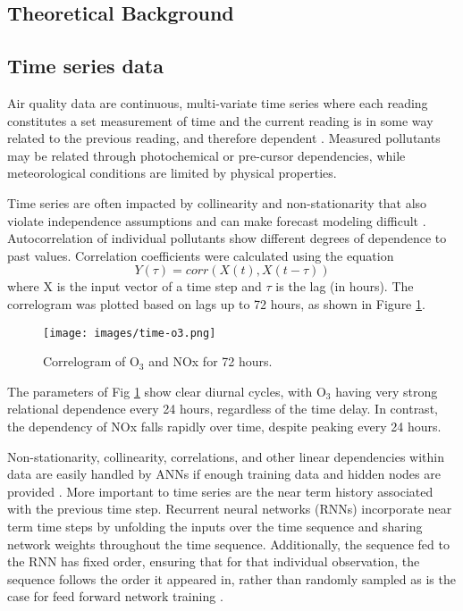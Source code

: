 \documentclass[preprint,12pt,a4paper,authoryear]{elsarticle}
\begin{document}
\begin{linenumbers}
\section{Theoretical Background}

\subsection{Time series data}
Air quality data are continuous, multi-variate time series where each reading constitutes a set measurement of time and the current reading is in some way related to the previous reading, and therefore dependent \citep{Gheyas2011}. Measured pollutants may be related through photochemical or pre-cursor dependencies, while meteorological conditions are limited by physical properties. 

Time series are often impacted by collinearity and non-stationarity that also violate independence assumptions and can make forecast modeling difficult \citep{Gheyas2011}. Autocorrelation of individual pollutants show different degrees of dependence to past values.  Correlation coefficients were calculated using the equation
%
\begin{equation}
\label{eq:corr}
Y(\tau)= corr(X(t),X(t - \tau))
\end{equation}
%
\noindent
where X is the input vector of a time step and $\tau$ is the lag (in hours). The correlogram was plotted based on lags up to 72 hours, as shown in Figure \ref{fig:serialcorr}.
%
\begin{figure}[H]
\centering
\texttt{[image: images/time-o3.png]}  %
\caption{Correlogram of O$_{3}$ and NOx for 72 hours.}
\label{fig:serialcorr}
\end{figure}
%
The parameters of Fig \ref{fig:serialcorr} show clear diurnal cycles, with O$_{3}$ having very strong relational dependence every 24 hours, regardless of the time delay. In contrast, the dependency of NOx falls rapidly over time, despite peaking every 24 hours. 

Non-stationarity, collinearity, correlations, and other linear dependencies within data are easily handled by ANNs if enough training data and hidden nodes are provided \citep{Goodfellow2016}. More important to time series are the near term history associated with the previous time step. Recurrent neural networks (RNNs) incorporate near term time steps by unfolding the inputs over the time sequence and sharing network weights throughout the time sequence. Additionally, the sequence fed to the RNN has fixed order, ensuring that for that individual observation, the sequence follows the order it appeared in, rather than randomly sampled as is the case for feed forward network training \citep{Elangasinghe2014}.


\end{linenumbers}
\end{document}
